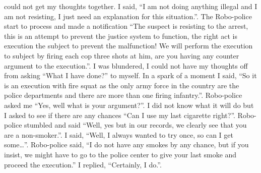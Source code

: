 \documentclass[]{book}
\begin{document}
could not get my thoughts together. I said, ``I am not doing anything illegal and I am not resisting, I just need an explanation for this situation.''. The Robo-police start to process and made a notification ``The suspect is resisting to the arrest, this is an attempt to prevent the justice system to function, the right act is execution the subject to prevent the malfunction! We will perform the execution to subject by firing each cop three shots at him, are you having any counter argument to the execution.''. I was blundered, I could not have my thoughts off from asking ``What I have done?'' to myself. In a spark of a moment I said, ``So it is an execution with fire squat as the only army force in the country are the police departments and there are more than one firing infantry.''. Robo-police asked me ``Yes, well what is your argument?''. I did not know what it will do but I asked to see if there are any chances ``Can I use my last cigarette right?''. Robo-police stumbled and said ``Well, yes but in our records, we clearly see that you are a non-smoker.''. I said, ``Well, I always wanted to try once, so can I get some\ldots{}''. Robo-police said, ``I do not have any smokes by any chance, but if you insist, we might have to go to the police center to give your last smoke and proceed the execution.'' I replied, ``Certainly, I do.''.
\end{document}
